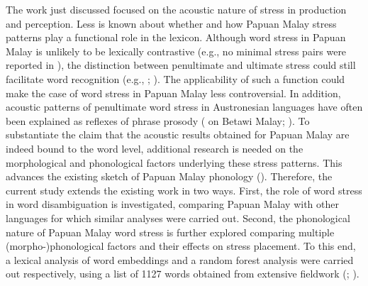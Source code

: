 The work just discussed focused on the acoustic nature of stress in production and perception. Less is known about whether and how Papuan Malay stress patterns play a functional role in the lexicon. Although word stress in Papuan Malay is unlikely to be lexically contrastive (e.g., no minimal stress pairs were reported in \citealt{kluge_grammar_2017}), the distinction between penultimate and ultimate stress could still facilitate word recognition (e.g., \citealt{cutler_lexical_2005}; \citealt{vanzanten_word_2004}). The applicability of such a function could make the case of word stress in Papuan Malay less controversial. In addition, acoustic patterns of penultimate word stress in Austronesian languages have often been explained as reflexes of phrase prosody (\citealt{vanheuven_betawi_2008} on Betawi Malay; \citealt{vanzanten_stress_2010}). To substantiate the claim that the acoustic results obtained for Papuan Malay are indeed bound to the word level, additional research is needed on the morphological and phonological factors underlying these stress patterns. This advances the existing sketch of Papuan Malay phonology (\citealt{kluge_grammar_2017}). Therefore, the current study extends the existing work in two ways. First, the role of word stress in word disambiguation is investigated, comparing Papuan Malay with other languages for which similar analyses were carried out. Second, the phonological nature of Papuan Malay word stress is further explored comparing multiple (morpho-)phonological factors and their effects on stress placement. To this end, a lexical analysis of word embeddings and a random forest analysis were carried out respectively, using a list of 1127 words obtained from extensive fieldwork (\citealt{kluge_grammar_2017}; \citealt{kluge_papuan_2014}).

